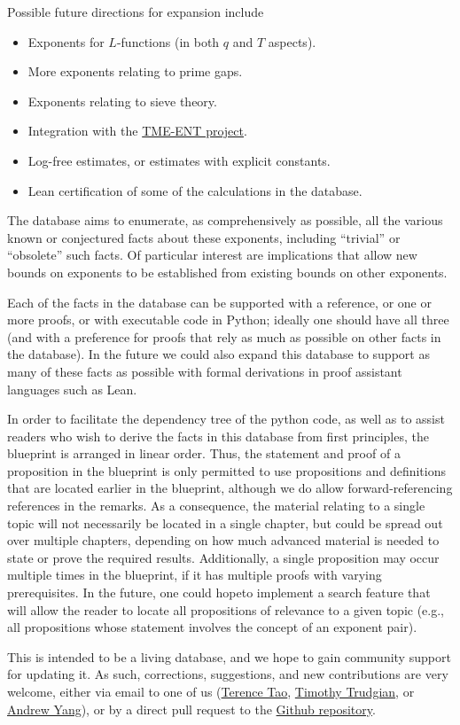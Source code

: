 Possible future directions for expansion include
\begin{itemize}
    \item Exponents for $L$-functions (in both $q$ and $T$ aspects).
    \item More exponents relating to prime gaps.
    \item Exponents relating to sieve theory.
    \item Integration with the \href{https://tmeemt.github.io/Chest/}{TME-ENT project}.
    \item Log-free estimates, or estimates with explicit constants.
    \item Lean certification of some of the calculations in the database.
\end{itemize}

The database aims to enumerate, as comprehensively as possible, all the various known or conjectured facts about these exponents, including ``trivial'' or ``obsolete'' such facts.  Of particular interest are implications that allow new bounds on exponents to be established from existing bounds on other exponents.

Each of the facts in the database can be supported with a reference, or one or more proofs, or with executable code in Python; ideally one should have all three (and with a preference for proofs that rely as much as possible on other facts in the database).  In the future we could also expand this database to support as many of these facts as possible with formal derivations in proof assistant languages such as Lean.

In order to facilitate the dependency tree of the python code, as well as to assist readers who wish to derive the facts in this database from first principles, the blueprint is arranged in linear order.  Thus, the statement and proof of a proposition in the blueprint is only permitted to use propositions and definitions that are located earlier in the blueprint, although we do allow forward-referencing references in the remarks.  As a consequence, the material relating to a single topic will not necessarily be located in a single chapter, but could be spread out over multiple chapters, depending on how much advanced material is needed to state or prove the required results.  Additionally, a single proposition may occur multiple times in the blueprint, if it has multiple proofs with varying prerequisites.  In the future, one could hopeto implement a search feature that will allow the reader to locate all propositions of relevance to a given topic (e.g., all propositions whose statement involves the concept of an exponent pair).

This is intended to be a living database, and we hope to gain community support for updating it.  As such, corrections, suggestions, and new contributions are very welcome, either via email to one of us (\href{mailto:tao@math.ucla.edu}{Terence Tao}, \href{mailto:timothy.trudgian@unsw.edu.au}{Timothy Trudgian}, or \href{mailto:andrew.yang1@unsw.edu.au}{Andrew Yang}), or by a direct pull request to the \href{https://github.com/teorth/expdb}{Github repository}.

